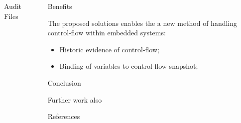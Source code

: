 \documentclass[final]{beamer}
\newlength{\sepwid}
\newlength{\onecolwid}
\newlength{\twocolwid}
\begin{document}
\begin{frame}[t]
\begin{columns}[t]
\begin{column}{\twocolwid}
\begin{columns}[t,totalwidth=\twocolwid]
\begin{column}{\onecolwid}
\begin{block}{Audit Files}
\end{block}

\end{column} %

\end{columns} %

\end{column} %


\begin{column}{\sepwid}\end{column} %

\begin{column}{\onecolwid} %

\begin{alertblock}{Benefits}

The proposed solutions enables the a new method of handling control-flow within embedded systems:
\begin{itemize}
\item Historic evidence of control-flow;
\item Binding of variables to control-flow snapshot;
\end{itemize}

\end{alertblock}

\vspace*{1cm}
\begin{block}{Conclusion}

Further work also

\end{block}

\vspace*{1cm}
\begin{block}{References}

\nocite{*} %
\small{
}


\end{block}
\end{column}
\end{columns}
\end{frame}
\end{document}
